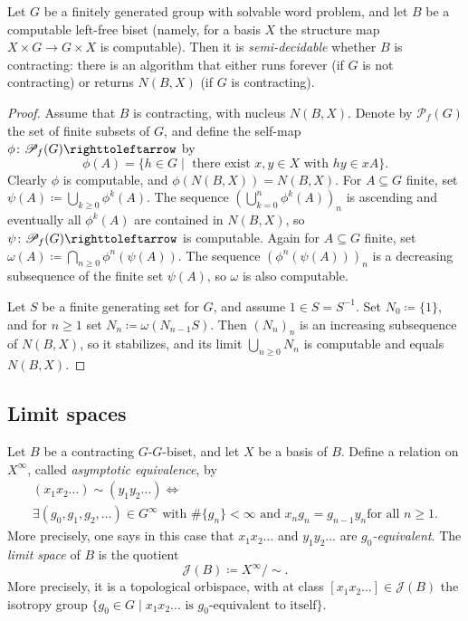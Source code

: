 \documentclass{amsart}
\newcommand\Julia{{\mathcal J}}
\begin{document}
\begin{prop}
  Let $G$ be a finitely generated group with solvable word problem,
  and let $B$ be a computable left-free biset (namely, for a basis $X$
  the structure map $X\times G\to G\times X$ is computable). Then it
  is \emph{semi-decidable} whether $B$ is contracting: there is an
  algorithm that either runs forever (if $G$ is not contracting) or
  returns $N(B,X)$ (if $G$ is contracting).
\end{prop}
\begin{proof}
  Assume that $B$ is contracting, with nucleus $N(B,X)$. Denote by
  $\mathscr P_f(G)$ the set of finite subsets of $G$, and define the
  self-map $\phi\colon\mathscr P_f(G)\selfmap$ by
  \[\phi(A)=\{h\in G\mid\text{ there exist $x,y\in X$ with }h y \in x A\}.
  \]
  Clearly $\phi$ is computable, and $\phi(N(B,X))=N(B,X)$. For
  $A\subseteq G$ finite, set
  $\psi(A)\coloneqq\bigcup_{k\ge0}\phi^k(A)$. The sequence
  $(\bigcup_{k=0}^n\phi^k(A))_n$ is ascending and eventually all
  $\phi^k(A)$ are contained in $N(B,X)$, so
  $\psi\colon\mathscr P_f(G)\selfmap$ is computable. Again for
  $A\subseteq G$ finite, set
  $\omega(A)\coloneqq\bigcap_{n\ge0}\phi^n(\psi(A))$. The sequence
  $(\phi^n(\psi(A)))_n$ is a decreasing subsequence of the finite set
  $\psi(A)$, so $\omega$ is also computable.

  Let $S$ be a finite generating set for $G$, and assume
  $1\in S=S^{-1}$. Set $N_0\coloneqq \{1\}$, and for $n\ge1$ set
  $N_n\coloneqq\omega(N_{n-1}S)$. Then $(N_n)_n$ is an increasing
  subsequence of $N(B,X)$, so it stabilizes, and its limit
  $\bigcup_{n\ge0} N_n$ is computable and equals $N(B,X)$.
\end{proof}

\subsection{Limit spaces}\label{ss:limit}
Let $B$ be a contracting $G$-$G$-biset, and let $X$ be a basis of
$B$. Define a relation on $X^\infty$, called \emph{asymptotic
  equivalence}, by
\begin{multline*}
  (x_1x_2\dots)\sim(y_1y_2\dots)\Longleftrightarrow\\
  \exists(g_0,g_1,g_2,\dots)\in
  G^\infty\text{ with $\#\{g_n\}<\infty$ and }x_n g_n=g_{n-1}y_n\text{
    for all }n\ge1.
\end{multline*}
More precisely, one says in this case that $x_1x_2\dots$ and
$y_1y_2\dots$ are \emph{$g_0$-equivalent}.  The \emph{limit space} of
$B$ is the quotient
\[\Julia(B)\coloneqq X^\infty/{\sim}.\]
More precisely, it is a topological orbispace, with at class
$[x_1 x_2\dots]\in\Julia(B)$ the isotropy group
$\{g_0\in G\mid x_1x_2\dots\text{ is $g_0$-equivalent to itself}\}$.
\end{document}
